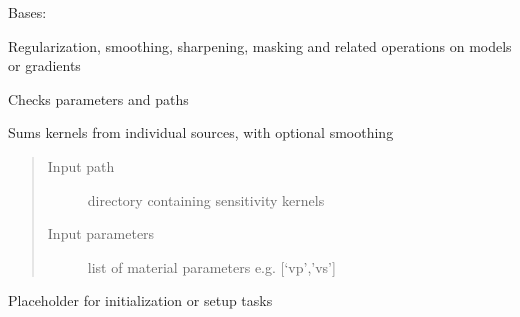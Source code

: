 \documentclass[letterpaper,10pt,english]{sphinxmanual}
\begin{document}
\begin{fulllineitems}
\label{\detokenize{ref/seisflows.postprocess:seisflows.postprocess.base.base}}
Bases: 

Regularization, smoothing, sharpening, masking and related operations
on models or gradients

\begin{fulllineitems}
\label{\detokenize{ref/seisflows.postprocess:seisflows.postprocess.base.base.check}}
Checks parameters and paths

\end{fulllineitems}


\begin{fulllineitems}
\label{\detokenize{ref/seisflows.postprocess:seisflows.postprocess.base.base.process_kernels}}
Sums kernels from individual sources, with optional smoothing
\begin{quote}\begin{description}
\item[{Input path}] \leavevmode
directory containing sensitivity kernels

\item[{Input parameters}] \leavevmode
list of material parameters e.g. {[}‘vp’,’vs’{]}

\end{description}\end{quote}

\end{fulllineitems}


\begin{fulllineitems}
\label{\detokenize{ref/seisflows.postprocess:seisflows.postprocess.base.base.setup}}
Placeholder for initialization or setup tasks


\end{fulllineitems}
\end{fulllineitems}
\end{document}
